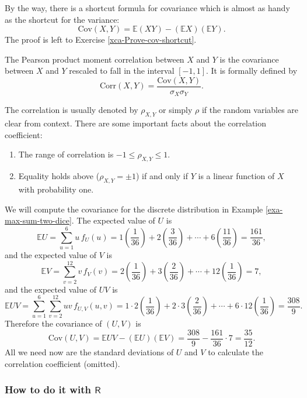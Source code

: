 By the way, there is a shortcut formula for covariance which is almost
as handy as the shortcut for the variance:
\begin{equation}
\mbox{Cov}(X,Y)=\mathbb{E}(XY)-(\mathbb{E} X)(\mathbb{E} Y).
\end{equation}
The proof is left to Exercise \ref{xca-Prove-cov-shortcut}.

The Pearson product moment correlation between \(X\) and \(Y\) is the
covariance between \(X\) and \(Y\) rescaled to fall in the interval
\([-1,1]\). It is formally defined by
\begin{equation}
\mbox{Corr}(X,Y)=\frac{\mbox{Cov}(X,Y)}{\sigma_{X}\sigma_{Y}}.
\end{equation}

The correlation is usually denoted by \(\rho_{X,Y}\) or simply
\(\rho\) if the random variables are clear from context. There are
some important facts about the correlation coefficient:
\begin{enumerate}
\item The range of correlation is \(-1\leq\rho_{X,Y}\leq1\).
\item Equality holds above (\(\rho_{X,Y}=\pm1\)) if and only if \(Y\) is a linear function of \(X\) with probability one.
\end{enumerate}

\label{exa-max-sum-dice-covariance} We will compute the covariance for the
discrete distribution in Example \ref{exa-max-sum-two-dice}. The expected
value of \(U\) is \[ \mathbb{E} U=\sum_{u=1}^{6}u\,
f_{U}(u)=1\left(\frac{1}{36}\right)+2\left(\frac{3}{36}\right)+\cdots+6\left(\frac{11}{36}\right)=\frac{161}{36},
\] and the expected value of \(V\) is \[ \mathbb{E}
V=\sum_{v=2}^{12}v\,f_{V}(v)=2\left(\frac{1}{36}\right)+3\left(\frac{2}{36}\right)+\cdots+12\left(\frac{1}{36}\right)=7,
\] and the expected value of \(UV\) is \[ \mathbb{E}
UV=\sum_{u=1}^{6}\sum_{v=2}^{12}uv\,
f_{U,V}(u,v)=1\cdot2\left(\frac{1}{36}\right)+2\cdot3\left(\frac{2}{36}\right)+\cdots+6\cdot12\left(\frac{1}{36}\right)=\frac{308}{9}.
\] Therefore the covariance of \((U,V)\) is \[
\mbox{Cov}(U,V)=\mathbb{E} UV-\left(\mathbb{E}
U\right)\left(\mathbb{E}
V\right)=\frac{308}{9}-\frac{161}{36}\cdot7=\frac{35}{12}.  \] All we
need now are the standard deviations of \(U\) and \(V\) to calculate
the correlation coefficient (omitted).

\subsubsection{How to do it with \(\mathsf{R}\)}
\label{sec-7-2-1-1}

